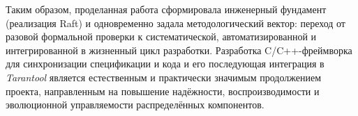 Таким образом, проделанная работа сформировала инженерный фундамент (реализация
Raft) и одновременно задала методологический вектор: переход от разовой
формальной проверки к систематической, автоматизированной и интегрированной в
жизненный цикл разработки. Разработка C/C++-фреймворка для синхронизации
спецификации и кода и его последующая интеграция в \textit{Tarantool} является
естественным и практически значимым продолжением проекта, направленным на
повышение надёжности, воспроизводимости и эволюционной управляемости
распределённых компонентов.

